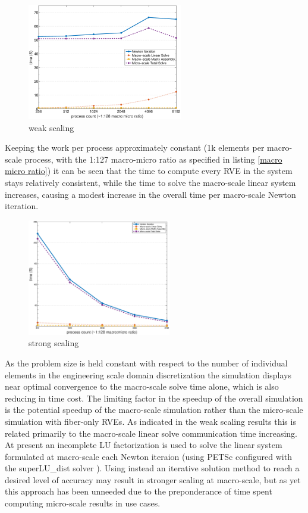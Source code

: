 \documentclass[11pt]{article}
\begin{document}
%
\begin{figure}
  \begin{center}
    \includegraphics[height=2in]{ws_phil.eps}
  \end{center}
  \caption{\small weak scaling}
  \label{weak scaling}
\end{figure}
%
Keeping the work per process approximately constant (1k elements per macro-scale process, with the 1:127 macro-micro ratio as specified in listing \ref{macro micro ratio}) it can be seen that the time to compute every RVE in the system stays relatively consistent, while the time to solve the macro-scale linear system increases, causing a modest increase in the overall time per macro-scale Newton iteration.

%
\begin{figure}
  \begin{center}
    \includegraphics[height=2in]{ss_phil.eps}
  \end{center}
  \caption{\small strong scaling}
  \label{strong scaling}
\end{figure}
%
As the problem size is held constant with respect to the number of individual elements in the engineering scale domain discretization the simulation displays near optimal convergence to the macro-scale solve time alone, which is also reducing in time cost. The limiting factor in the speedup of the overall simulation is the potential speedup of the macro-scale simulation rather than the micro-scale simulation with fiber-only RVEs. As indicated in the weak scaling results this is related primarily to the macro-scale linear solve communication time increasing. At present an incomplete LU factorization is used to solve the linear system formulated at macro-scale each Newton iteraion (using PETSc configured with the superLU\_dist solver \cite{li05superlu,lishao10superluilu,lidemmel03superludist} ). Using instead an iterative solution method to reach a desired level of accuracy may result in stronger scaling at macro-scale, but as yet this approach has been unneeded due to the preponderance of time spent computing micro-scale results in use cases.
\end{document}
